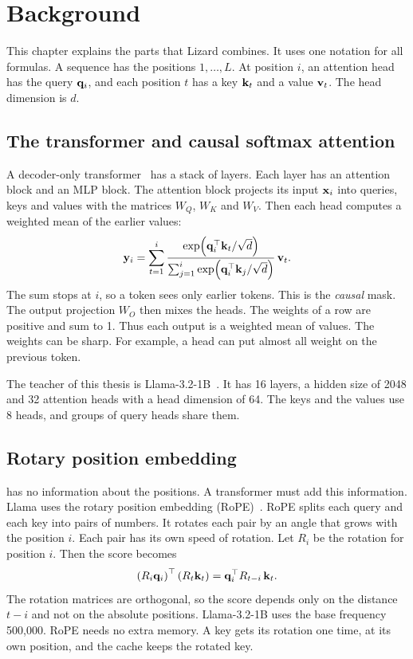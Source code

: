 \chapter{Background}
\label{ch:background}

This chapter explains the parts that Lizard combines. It uses one notation for all formulas. A sequence has the positions $1, \dots, L$. At position $i$, an attention head has the query $\mathbf{q}_i$, and each position $t$ has a key $\mathbf{k}_t$ and a value $\mathbf{v}_t$. The head dimension is $d$.

\section{The transformer and causal softmax attention}
\label{sec:softmax}

A decoder-only transformer~\cite{vaswani2017} has a stack of layers. Each layer has an attention block and an MLP block. The attention block projects its input $\mathbf{x}_i$ into queries, keys and values with the matrices $W_Q$, $W_K$ and $W_V$. Then each head computes a weighted mean of the earlier values:
\begin{equation}
\mathbf{y}_i = \sum_{t=1}^{i} \frac{\exp\!\left(\mathbf{q}_i^\top \mathbf{k}_t / \sqrt{d}\right)}{\sum_{j=1}^{i} \exp\!\left(\mathbf{q}_i^\top \mathbf{k}_j / \sqrt{d}\right)}\, \mathbf{v}_t .
\label{eq:softmax}
\end{equation}
The sum stops at $i$, so a token sees only earlier tokens. This is the \emph{causal} mask. The output projection $W_O$ then mixes the heads. The weights of a row are positive and sum to 1. Thus each output is a weighted mean of values. The weights can be sharp. For example, a head can put almost all weight on the previous token.

The teacher of this thesis is Llama-3.2-1B~\cite{llama3}. It has 16 layers, a hidden size of 2048 and 32 attention heads with a head dimension of 64. The keys and the values use 8 heads, and groups of query heads share them.

\section{Rotary position embedding}
\label{sec:rope}

 has no information about the positions. A transformer must add this information. Llama uses the rotary position embedding (RoPE)~\cite{roformer}. RoPE splits each query and each key into pairs of numbers. It rotates each pair by an angle that grows with the position $i$. Each pair has its own speed of rotation. Let $R_i$ be the rotation for position $i$. Then the score becomes
\begin{equation}
\left(R_i \mathbf{q}_i\right)^\top \left(R_t \mathbf{k}_t\right) = \mathbf{q}_i^\top R_{t-i}\, \mathbf{k}_t .
\label{eq:rope}
\end{equation}
The rotation matrices are orthogonal, so the score depends only on the distance $t - i$ and not on the absolute positions. Llama-3.2-1B uses the base frequency 500,000. RoPE needs no extra memory. A key gets its rotation one time, at its own position, and the cache keeps the rotated key.

